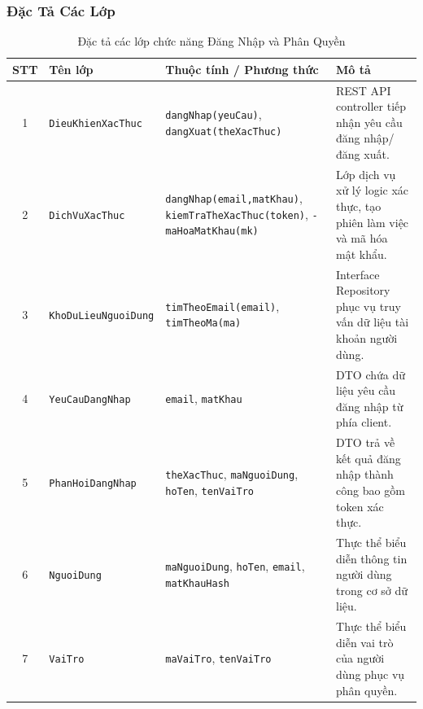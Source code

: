 \subsubsection{Đặc Tả Các Lớp}
\begin{table}[H]
  \centering
  \small
  \begin{tabularx}{\textwidth}{|c|>{\raggedright\arraybackslash}p{3.5cm}|>{\raggedright\arraybackslash}p{4.5cm}|>{\raggedright\arraybackslash}X|}
    \hline
    \textbf{STT} & \textbf{Tên lớp} & \textbf{Thuộc tính / Phương thức} & \textbf{Mô tả} \\
    \hline
    1 & \texttt{Dieu\allowbreak Khien\allowbreak Xac\allowbreak Thuc} & \texttt{dang\allowbreak Nhap\allowbreak (yeu\allowbreak Cau)}, \texttt{dang\allowbreak Xuat\allowbreak (the\allowbreak Xac\allowbreak Thuc)} & REST API controller tiếp nhận yêu cầu đăng nhập/đăng xuất. \\ \hline
    2 & \texttt{Dich\allowbreak Vu\allowbreak Xac\allowbreak Thuc} & \texttt{dang\allowbreak Nhap\allowbreak (email,\allowbreak mat\allowbreak Khau)}, \texttt{kiem\allowbreak Tra\allowbreak The\allowbreak Xac\allowbreak Thuc\allowbreak (token)}, \texttt{- ma\allowbreak Hoa\allowbreak Mat\allowbreak Khau\allowbreak (mk)} & Lớp dịch vụ xử lý logic xác thực, tạo phiên làm việc và mã hóa mật khẩu. \\ \hline
    3 & \texttt{Kho\allowbreak Du\allowbreak Lieu\allowbreak Nguoi\allowbreak Dung} & \texttt{tim\allowbreak Theo\allowbreak Email\allowbreak (email)}, \texttt{tim\allowbreak Theo\allowbreak Ma\allowbreak (ma)} & Interface Repository phục vụ truy vấn dữ liệu tài khoản người dùng. \\ \hline
    4 & \texttt{Yeu\allowbreak Cau\allowbreak Dang\allowbreak Nhap} & \texttt{email}, \texttt{mat\allowbreak Khau} & DTO chứa dữ liệu yêu cầu đăng nhập từ phía client. \\ \hline
    5 & \texttt{Phan\allowbreak Hoi\allowbreak Dang\allowbreak Nhap} & \texttt{the\allowbreak Xac\allowbreak Thuc}, \texttt{ma\allowbreak Nguoi\allowbreak Dung}, \texttt{ho\allowbreak Ten}, \texttt{ten\allowbreak Vai\allowbreak Tro} & DTO trả về kết quả đăng nhập thành công bao gồm token xác thực. \\ \hline
    6 & \texttt{Nguoi\allowbreak Dung} & \texttt{ma\allowbreak Nguoi\allowbreak Dung}, \texttt{ho\allowbreak Ten}, \texttt{email}, \texttt{mat\allowbreak Khau\allowbreak Hash} & Thực thể biểu diễn thông tin người dùng trong cơ sở dữ liệu. \\ \hline
    7 & \texttt{Vai\allowbreak Tro} & \texttt{ma\allowbreak Vai\allowbreak Tro}, \texttt{ten\allowbreak Vai\allowbreak Tro} & Thực thể biểu diễn vai trò của người dùng phục vụ phân quyền. \\
    \hline
  \end{tabularx}
  \caption{Đặc tả các lớp chức năng Đăng Nhập và Phân Quyền}
  \label{tab:class-spec-uc01}
\end{table}

